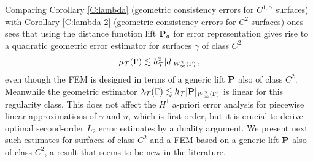 Comparing Corollary \ref{C:lambda} (geometric consistency errors for $C^{1,\alpha}$
surfaces) with Corollary \ref{C:lambda-2} (geometric consistency errors for
$C^{2}$ surfaces) ones sees that using the distance function lift ${\bf P}_d$
for error representation gives rise to a quadratic geometric error estimator for surfaces
$\gamma$ of class $C^2$
%
\[
\mu_{\mathcal{T}}(\Gamma)  \lesssim h_{\mathcal{T}}^2 |d|_{W^2_\infty(\Gamma)} \, ,
\]
%
even though the FEM is designed in terms of a generic lift ${\bf P}$ also of class $C^2$.
Meanwhile the geometric estimator
$\lambda_{\mathcal{T}}(\Gamma)\lesssim h_{\mathcal{T}} |{\bf P}|_{W^2_\infty (\Gamma)}$ is linear for this
regularity class.
This does not affect the $H^1$ a-priori error analysis for piecewise linear
approximations of $\gamma$ and $u$, which is first order, but it is crucial to derive
optimal second-order $L_2$ error estimates by a duality argument. We present next
such estimates for surfaces of class $C^2$ and a FEM based on a generic lift ${\bf P}$ also
of class $C^2$, a result that seems to be new in the literature.

